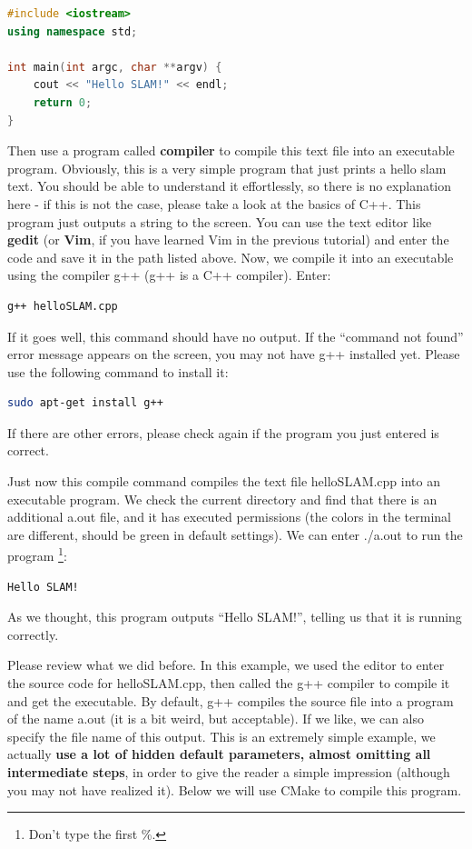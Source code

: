 \begin{lstlisting}[language=C++,caption=slambook2/ch2/helloSLAM.cpp]
#include <iostream>
using namespace std;

int main(int argc, char **argv) {
    cout << "Hello SLAM!" << endl;
    return 0;
}
\end{lstlisting}

Then use a program called \textbf{compiler} to compile this text file into an executable program. Obviously, this is a very simple program that just prints a hello slam text. You should be able to understand it effortlessly, so there is no explanation here - if this is not the case, please take a look at the basics of C++. This program just outputs a string to the screen. You can use the text editor like \textbf{gedit} (or \textbf{Vim}, if you have learned Vim in the previous tutorial) and enter the code and save it in the path listed above. Now, we compile it into an executable using the compiler g++ (g++ is a C++ compiler). Enter:

\begin{lstlisting}[language=sh,caption=Terminal input:]
g++ helloSLAM.cpp
\end{lstlisting}

If it goes well, this command should have no output. If the ``command not found'' error message appears on the screen, you may not have g++ installed yet. Please use the following command to install it:
\begin{lstlisting}[language=sh,caption=terminal input:]
sudo apt-get install g++
\end{lstlisting}
If there are other errors, please check again if the program you just entered is correct.

Just now this compile command compiles the text file helloSLAM.cpp into an executable program. We check the current directory and find that there is an additional a.out file, and it has executed permissions (the colors in the terminal are different, should be green in default settings). We can enter ./a.out to run the program \footnote{Don't type the first \%. }:

\begin{lstlisting}[language=sh,caption=terminal input:]
% ./a.out
Hello SLAM!
\end{lstlisting}

As we thought, this program outputs ``Hello SLAM!'', telling us that it is running correctly.

Please review what we did before. In this example, we used the editor to enter the source code for helloSLAM.cpp, then called the g++ compiler to compile it and get the executable. By default, g++ compiles the source file into a program of the name a.out (it is a bit weird, but acceptable). If we like, we can also specify the file name of this output. This is an extremely simple example, we actually \textbf{use a lot of hidden default parameters, almost omitting all intermediate steps}, in order to give the reader a simple impression (although you may not have realized it). Below we will use CMake to compile this program.

